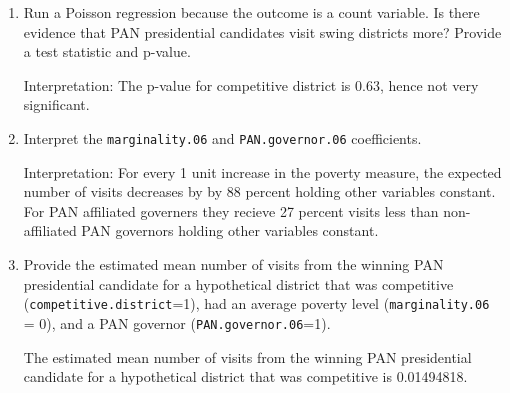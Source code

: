 \documentclass[12pt,letterpaper]{article}
\begin{document}
\begin{enumerate}
	\item [(a)]
	Run a Poisson regression because the outcome is a count variable. Is there evidence that PAN presidential candidates visit swing districts more? Provide a test statistic and p-value.
	 
	\noindent Interpretation: The p-value for competitive district is 0.63, hence not very significant.
	\item [(b)]
	Interpret the \texttt{marginality.06} and \texttt{PAN.governor.06} coefficients.
	 
	\noindent Interpretation: For every 1 unit increase in the poverty measure, the expected number of visits decreases by by 88 percent holding other variables constant. For PAN affiliated governers they recieve 27 percent visits less than non-affiliated PAN governors holding other variables constant.

	\item [(c)]
	Provide the estimated mean number of visits from the winning PAN presidential candidate for a hypothetical district that was competitive (\texttt{competitive.district}=1), had an average poverty level (\texttt{marginality.06} = 0), and a PAN governor (\texttt{PAN.governor.06}=1).
	 
	\noindent The estimated mean number of visits from the winning PAN presidential candidate for a hypothetical district that was competitive is 0.01494818.
\end{enumerate}
\end{document}
